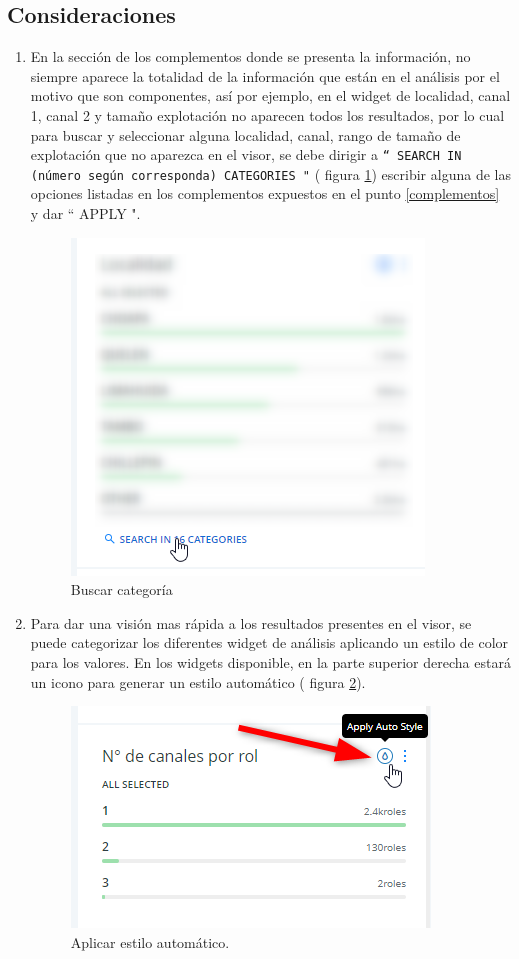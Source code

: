 \documentclass[10pt]{article}
\begin{document}
\subsection{Consideraciones}
\begin{enumerate}

\item En la sección de los complementos donde se presenta la información, no siempre aparece la totalidad de la información que están en el análisis por el motivo que son componentes, así por ejemplo, en el widget de localidad, canal 1, canal 2 y tamaño explotación no aparecen todos los resultados, por lo cual para buscar y seleccionar alguna localidad, canal, rango de tamaño de explotación que no aparezca en el visor, se debe dirigir a \texttt  {“ SEARCH IN (número según corresponda) CATEGORIES "} ( figura \ref{search}) escribir alguna de las opciones listadas en los complementos expuestos en el punto \ref{complementos}  y dar “ APPLY ". 

\begin{figure}[H]
\centering
\includegraphics[scale=0.8]{Figuras_manual/search.png}
\caption{Buscar categoría}
\label{search}
\end{figure}

\item Para dar una visión mas rápida a los resultados presentes en el visor, se puede categorizar los diferentes widget de análisis aplicando un estilo de color para los valores. En los widgets disponible, en la parte superior derecha estará un icono para generar un estilo automático ( figura \ref{aplicarestilo}).


\begin{figure}[H]
\centering
\includegraphics[scale=1]{Figuras_manual/aplicar_color.png}
\caption{Aplicar estilo automático.}
\label{aplicarestilo}
\end{figure}


\end{enumerate}
\end{document}
